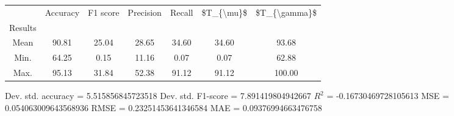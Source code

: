 \begin{tabular}{|c|c|c|c|c|c|c|}
\toprule
{} &  Accuracy &  F1 score &  Precision &  Recall &  \$T\_\{\textbackslash mu\}\$ &  \$T\_\{\textbackslash gamma\}\$ \\
Results &           &           &            &         &            &               \\
\hline
Mean    &     90.81 &     25.04 &      28.65 &   34.60 &      34.60 &         93.68 \\
Min.    &     64.25 &      0.15 &      11.16 &    0.07 &       0.07 &         62.88 \\
Max.    &     95.13 &     31.84 &      52.38 &   91.12 &      91.12 &        100.00 \\
\bottomrule
\end{tabular}

 Dev. std. accuracy = 5.515856845723518
 Dev. std. F1-score = 7.891419804942667
 $R^2$ = -0.16730469728105613
 MSE = 0.054063009643568936
 RMSE = 0.23251453641346584
 MAE = 0.09376994663476758